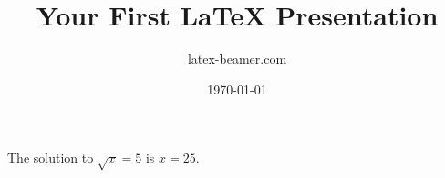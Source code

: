 \documentclass{beamer}
\title{Your First \LaTeX{} Presentation}
\author{latex-beamer.com}
\date{\today}
\begin{document}
	\begin{frame}
		\titlepage
	\end{frame}


\begin{frame}
	



	The solution to $\sqrt{x}=5$ is $x=25$.
	

	
\end{frame}
\end{document}
